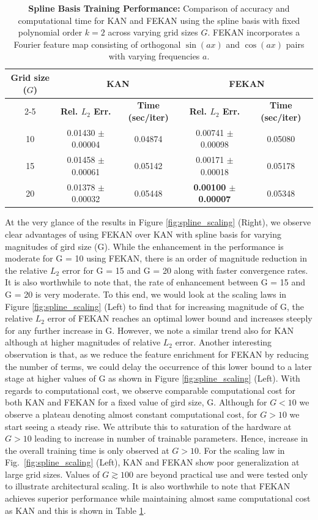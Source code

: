 \documentclass{article}
\begin{document}
\begin{table}[H]
\centering
\begin{tabular}{|c||c|c||c|c|}
\hline
\multirow{2}{*}{\textbf{Grid size ($G$)}} & \multicolumn{2}{c|}{\textbf{KAN}} & \multicolumn{2}{c|}{\textbf{FEKAN}} \\ \cline{2-5}
 & \textbf{Rel. $L_2$ Err.} & \textbf{Time (sec/iter)} & \textbf{Rel. $L_2$ Err.} & \textbf{Time (sec/iter)} \\ \hline
10 & 0.01430 $\pm$ 0.00004 & 0.04874 & 0.00741 $\pm$ 0.00098 & 0.05080 \\ \hline
15 & 0.01458 $\pm$ 0.00061 & 0.05142 & 0.00171 $\pm$ 0.00018 & 0.05178 \\ \hline
20 & 0.01378 $\pm$ 0.00032 & 0.05448 & \textbf{0.00100 $\pm$ 0.00007} & 0.05348 \\ \hline
\end{tabular}
\caption{\textbf{Spline Basis Training Performance:} Comparison of accuracy and computational time for KAN and FEKAN using the spline basis with fixed polynomial order $k = 2$ across varying grid sizes $G$. FEKAN incorporates a Fourier feature map consisting of orthogonal $\sin(ax)$ and $\cos(ax)$ pairs with varying frequencies $a$.}
\label{tab:spline_scaling}
\end{table}

At the very glance of the results in Figure \ref{fig:spline_scaling} (Right), we observe clear advantages of using FEKAN over KAN with spline basis for varying magnitudes of gird size (G). While the enhancement in the performance is moderate for G = 10 using FEKAN, there is an order of magnitude reduction in the relative $L_2$ error for G = 15 and G = 20 along with faster convergence rates. It is also worthwhile to note that, the rate of enhancement between G = 15 and G = 20 is very moderate. To this end, we would look at the scaling laws in Figure \ref{fig:spline_scaling} (Left) to find that for increasing magnitude of G, the relative $L_2$ error of FEKAN reaches an optimal lower bound and increases steeply for any further increase in G. However, we note a similar trend also for KAN although at higher magnitudes of relative $L_2$ error. Another interesting observation is that, as we reduce the feature enrichment for FEKAN by reducing the number of terms, we could delay the occurrence of this lower bound to a later stage at higher values of G as shown in Figure \ref{fig:spline_scaling} (Left). With regards to computational cost, we observe comparable computational cost for both KAN and FEKAN for a fixed value of gird size, G. Although for $G < 10$ we observe a plateau denoting almost constant computational cost, for $G > 10$ we start seeing a steady rise. We attribute this to saturation of the hardware at $G > 10$ leading to increase in number of trainable parameters. Hence, increase in the overall training time is only observed at $G > 10$. For the scaling law in Fig.~\ref{fig:spline_scaling} (Left), KAN and FEKAN show poor generalization at large grid sizes. Values of $G \gtrsim 100$ are beyond practical use and were tested only to illustrate architectural scaling. It is also worthwhile to note that FEKAN achieves superior performance while maintaining almost same computational cost as KAN and this is shown in Table \ref{tab:spline_scaling}.
\end{document}
